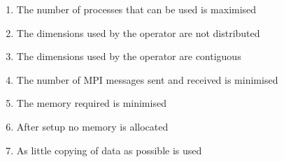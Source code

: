 \documentclass{beamer}
\begin{document}
\begin{NoSidebarFrame}
\end{NoSidebarFrame}

\begin{NoSidebarFrame}
 \begin{enumerate}
 \item The number of processes that can be used is maximised \label{Condition Max nprocs}
 \item The dimensions used by the operator are not distributed  \label{Condition distribution}
 \item The dimensions used by the operator are contiguous \label{Condition contiguous}
 \item The number of MPI messages sent and received is minimised \label{Condition MPI overhead}
 \item The memory required is minimised \label{Condition memory}
 \item After setup no memory is allocated \label{Condition allocation}
 \item As little copying of data as possible is used \label{Condition copying}
\end{enumerate}
\end{NoSidebarFrame}

\TargetDimsNotDistribtrue
\end{document}
